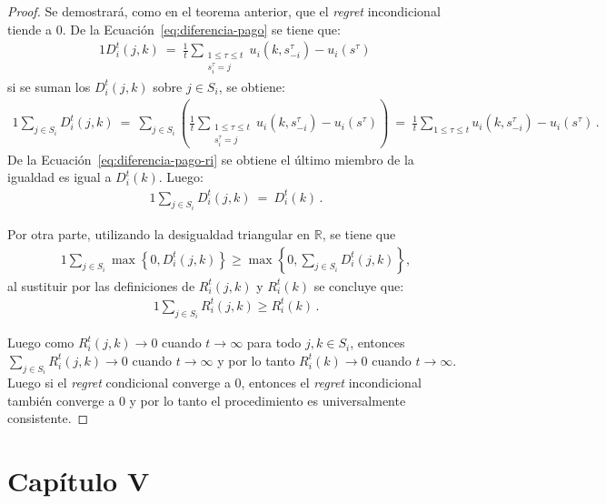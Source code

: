 \begin{proof}
Se demostrará, como en el teorema anterior, que el \textit{regret} incondicional tiende a $0$. De la Ecuación~\ref{eq:diferencia-pago} se tiene que:
\begin{alignat}{1}
  D_i^t(j, k)\ =\ \frac{1}{t} \sum_{\substack{1\leq \tau \leq t \\s^\tau_i = j}} u_i(k, s_{-i}^{\tau}) - u_i(s^{\tau})\,
\end{alignat}
si se suman los $D_i^t(j, k)$ sobre $j \in S_i$, se obtiene:
\begin{alignat}{1}
  \sum_{j \in S_i} D_i^t(j, k)\ =\ \sum_{j \in S_i}{\left( \frac{1}{t} \sum_{\substack{1\leq \tau \leq t \\s^\tau_i = j}} u_i(k, s_{-i}^{\tau}) - u_i(s^{\tau}) \right)}\ =\ \frac{1}{t} \sum_{1\leq \tau \leq t} u_i(k, s_{-i}^{\tau}) - u_i(s^{\tau}) \,.
\end{alignat}
De la Ecuación~\ref{eq:diferencia-pago-ri} se obtiene el último miembro de la igualdad es igual a $D_i^t(k)$. Luego:
\begin{alignat}{1}
    \sum_{j \in S_i} D_i^t(j, k)\ =\ D_i^t(k) \,.
\end{alignat}

Por otra parte, utilizando la desigualdad triangular en $\mathbb{R}$, se tiene que
\begin{alignat}{1}
    \sum_{j \in S_i} \max \left\{ 0, D^t_i(j, k)\right\} \geq \max\left\{0, \sum_{j \in S_i} D^t_i(j, k)\right\},
\end{alignat}
al sustituir por las definiciones de $R_i^t(j, k)$ y $R_i^t(k)$ se concluye que:
\begin{alignat}{1}
    \sum_{j \in S_i} R_i^t(j, k) \geq R_i^t(k) \,.
\end{alignat}

Luego como $R_i^t(j, k) \rightarrow 0$ cuando $t \rightarrow \infty$ para todo $j, k \in S_i$, entonces $\sum_{j \in S_i} R_i^t(j, k) \rightarrow 0$ cuando $t \rightarrow \infty$ y por lo tanto $R_i^t(k) \rightarrow 0$ cuando $t \rightarrow \infty$. Luego si el \textit{regret} condicional converge a 0, entonces el \textit{regret} incondicional también converge a $0$ y por lo tanto el procedimiento es universalmente consistente.
\end{proof}

\section*{Capítulo V}

